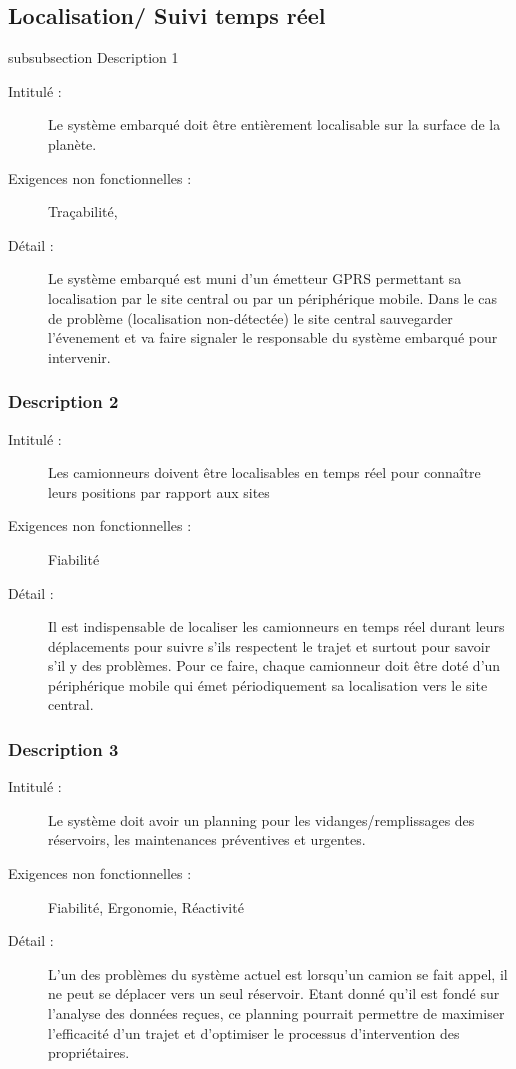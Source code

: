 \subsection {Localisation/ Suivi temps réel}
subsubsection {Description 1}
\begin{description}
           \item[Intitulé :] Le système embarqué doit être entièrement localisable sur la surface de la planète. 
           \item[Exigences non fonctionnelles :] Traçabilité, 
           \item[Détail :] Le système embarqué est muni d'un émetteur GPRS permettant sa localisation par le site central ou par un périphérique mobile.
Dans le cas de problème (localisation non-détectée) le site central sauvegarder l'évenement et va faire signaler le responsable du système embarqué pour intervenir. 
\end{description}

\subsubsection {Description 2}
\begin{description}
           \item[Intitulé :] Les camionneurs doivent être localisables en temps réel pour connaître leurs positions par rapport aux sites 
           \item[Exigences non fonctionnelles :] Fiabilité
           \item[Détail :] Il est indispensable de localiser les camionneurs en temps réel durant leurs déplacements pour suivre s’ils respectent le trajet et surtout pour savoir s’il y des problèmes. Pour ce faire, chaque camionneur doit être doté d'un 
périphérique mobile qui émet périodiquement sa localisation vers le site central.
\end{description}

\subsubsection {Description 3}
\begin{description}
           \item[Intitulé :] Le système doit avoir un planning pour les vidanges/remplissages des réservoirs, les maintenances préventives et urgentes. 
           \item[Exigences non fonctionnelles :] Fiabilité, Ergonomie, Réactivité
           \item[Détail :] L’un des problèmes du système actuel est lorsqu’un camion se fait appel, il ne peut se déplacer vers un seul réservoir. Etant  donné qu’il est fondé sur l’analyse des données reçues, ce planning pourrait permettre de maximiser l’efficacité d’un trajet et d’optimiser le processus d’intervention des propriétaires. 
\end{description}

